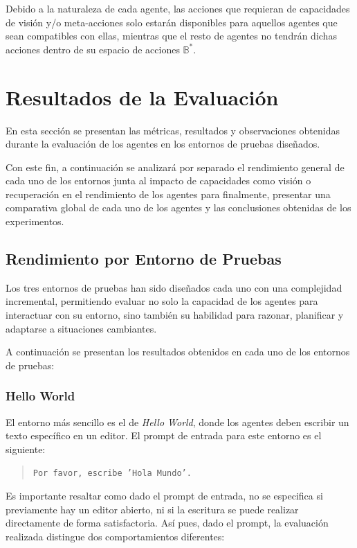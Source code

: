 Debido a la naturaleza de cada agente, las acciones que requieran de 
capacidades de visión y/o meta-acciones solo estarán disponibles para aquellos
agentes que sean compatibles con ellas, mientras que el resto de agentes no tendrán
dichas acciones dentro de su espacio de acciones \(\mathbb{B}^*\).

\section{Resultados de la Evaluación}
En esta sección se presentan las métricas, resultados y observaciones obtenidas
durante la evaluación de los agentes en los entornos de pruebas diseñados.

Con este fin, a continuación se analizará por separado el rendimiento general
de cada uno de los entornos junta al impacto de capacidades como visión o recuperación
en el rendimiento de los agentes para finalmente, presentar una comparativa global
de cada uno de los agentes y las conclusiones obtenidas de los experimentos.

\subsection{Rendimiento por Entorno de Pruebas}
Los tres entornos de pruebas han sido diseñados cada uno con una complejidad
incremental, permitiendo evaluar no solo la capacidad de los agentes para
interactuar con su entorno, sino también su habilidad para razonar, planificar
y adaptarse a situaciones cambiantes.

A continuación se presentan los resultados obtenidos en cada uno de los entornos
de pruebas:

\subsubsection{Hello World}
El entorno más sencillo es el de \emph{Hello World}, donde los agentes
deben escribir un texto específico en un editor. 
El prompt de entrada para este entorno es el siguiente:

\begin{quote}
    \texttt{Por favor, escribe 'Hola Mundo'.}
\end{quote}

Es importante resaltar como dado el prompt de entrada, no se especifica si 
previamente hay un editor abierto, ni si la escritura se puede realizar
directamente de forma satisfactoria. Así pues, dado el prompt, la evaluación
realizada distingue dos comportamientos diferentes:

